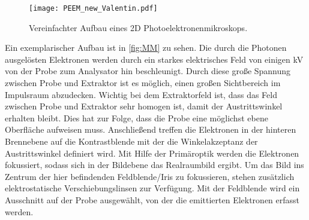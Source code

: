        \begin{figure}
            \centering
            \texttt{[image: PEEM\_new\_Valentin.pdf]}
            \caption{Vereinfachter Aufbau eines 2D Photoelektronenmikroskops.} 
            \label{fig:MM}
        \end{figure}
        Ein exemplarischer Aufbau ist in \autoref{fig:MM} zu sehen.
        Die durch die Photonen ausgelösten Elektronen werden durch ein starkes elektrisches Feld von einigen \si{\kilo\volt} von der Probe zum Analysator hin beschleunigt.
        Durch diese große Spannung zwischen Probe und Extraktor ist es möglich, einen großen Sichtbereich im Impulsraum abzudecken.
        Wichtig bei dem Extraktorfeld ist, dass das Feld zwischen Probe und Extraktor sehr homogen ist, damit der Austrittswinkel erhalten bleibt.
        Dies hat zur Folge, dass die Probe eine möglichst ebene Oberfläche aufweisen muss.
        Anschließend treffen die Elektronen in der hinteren Brennebene auf die Kontrastblende mit der die Winkelakzeptanz der Austrittswinkel definiert wird.
        Mit Hilfe der Primäroptik werden die Elektronen fokussiert, sodass sich in der Bildebene das Realraumbild ergibt.
        Um das Bild ins Zentrum der hier befindenden Feldblende/Iris zu fokussieren, stehen zusätzlich elektrostatische Verschiebungslinsen zur Verfügung.
        Mit der Feldblende wird ein Ausschnitt auf der Probe ausgewählt, von der die emittierten Elektronen erfasst werden.

